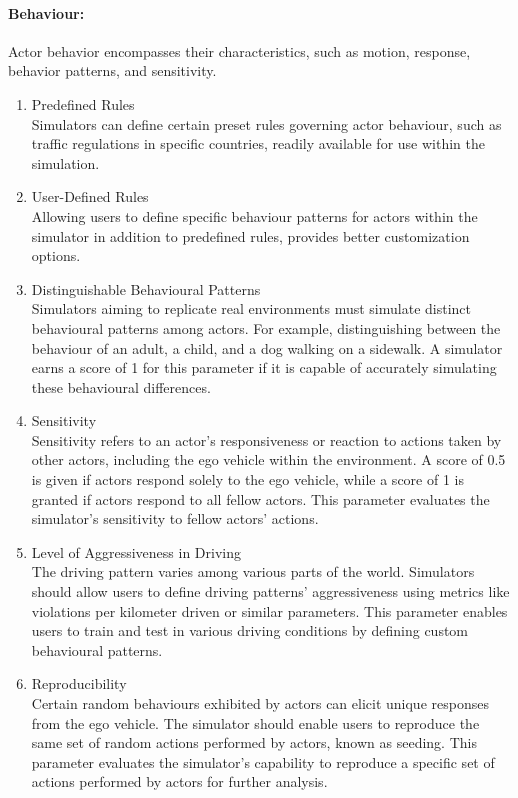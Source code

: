 \documentclass[12pt,twoside,a4paper,parskip]{scrbook} %
\begin{document}
\paragraph*{Behaviour:}
Actor behavior encompasses their characteristics, such as motion, response, behavior patterns, and sensitivity.
\begin{enumerate}[label=\alph*.]
    \item Predefined Rules\\
    Simulators can define certain preset rules governing actor behaviour, such as traffic regulations in specific countries, readily available for use within the simulation.
    
    \item User-Defined Rules\\
    Allowing users to define specific behaviour patterns for actors within the simulator in addition to predefined rules, provides better customization options.
    
    \item Distinguishable Behavioural Patterns\\
    Simulators aiming to replicate real environments must simulate distinct behavioural patterns among actors. For example, distinguishing between the behaviour of an adult, a child, and a dog walking on a sidewalk. A simulator earns a score of 1 for this parameter if it is capable of accurately simulating these behavioural differences.
    
    \item Sensitivity\\
    Sensitivity refers to an actor's responsiveness or reaction to actions taken by other actors, including the ego vehicle within the environment. A score of 0.5 is given if actors respond solely to the ego vehicle, while a score of 1 is granted if actors respond to all fellow actors. This parameter evaluates the simulator's sensitivity to fellow actors' actions.

    \item Level of Aggressiveness in Driving\\
    The driving pattern varies among various parts of the world. Simulators should allow users to define driving patterns' aggressiveness using metrics like violations per kilometer driven or similar parameters. This parameter enables users to train and test in various driving conditions by defining custom behavioural patterns.
    
    \item Reproducibility\\
    Certain random behaviours exhibited by actors can elicit unique responses from the ego vehicle. The simulator should enable users to reproduce the same set of random actions performed by actors, known as seeding. This parameter evaluates the simulator's capability to reproduce a specific set of actions performed by actors for further analysis.
    
\end{enumerate}
\end{document}
